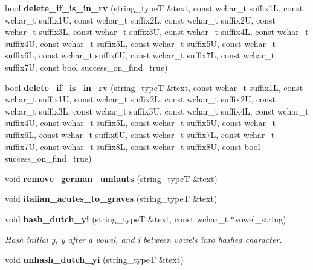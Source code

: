 \begin{DoxyCompactItemize}
\item 
bool {\bfseries delete\+\_\+if\+\_\+is\+\_\+in\+\_\+rv} (string\+\_\+typeT \&text, const wchar\+\_\+t suffix1L, const wchar\+\_\+t suffix1U, const wchar\+\_\+t suffix2L, const wchar\+\_\+t suffix2U, const wchar\+\_\+t suffix3L, const wchar\+\_\+t suffix3U, const wchar\+\_\+t suffix4L, const wchar\+\_\+t suffix4U, const wchar\+\_\+t suffix5L, const wchar\+\_\+t suffix5U, const wchar\+\_\+t suffix6L, const wchar\+\_\+t suffix6U, const wchar\+\_\+t suffix7L, const wchar\+\_\+t suffix7U, const bool success\+\_\+on\+\_\+find=true)\label{classstemming_1_1stem_acc427221d55bf93e113f2811eedca74a}

\item 
bool {\bfseries delete\+\_\+if\+\_\+is\+\_\+in\+\_\+rv} (string\+\_\+typeT \&text, const wchar\+\_\+t suffix1L, const wchar\+\_\+t suffix1U, const wchar\+\_\+t suffix2L, const wchar\+\_\+t suffix2U, const wchar\+\_\+t suffix3L, const wchar\+\_\+t suffix3U, const wchar\+\_\+t suffix4L, const wchar\+\_\+t suffix4U, const wchar\+\_\+t suffix5L, const wchar\+\_\+t suffix5U, const wchar\+\_\+t suffix6L, const wchar\+\_\+t suffix6U, const wchar\+\_\+t suffix7L, const wchar\+\_\+t suffix7U, const wchar\+\_\+t suffix8L, const wchar\+\_\+t suffix8U, const bool success\+\_\+on\+\_\+find=true)\label{classstemming_1_1stem_ab0b50197480905de68f3be29714860d7}

\item 
void {\bfseries remove\+\_\+german\+\_\+umlauts} (string\+\_\+typeT \&text)\label{classstemming_1_1stem_a760765796790f28c1acfa3b1e603781d}

\item 
void {\bfseries italian\+\_\+acutes\+\_\+to\+\_\+graves} (string\+\_\+typeT \&text)\label{classstemming_1_1stem_a85e349feabc837fa38ceb40cbfe8f16e}

\item 
void {\bf hash\+\_\+dutch\+\_\+yi} (string\+\_\+typeT \&text, const wchar\+\_\+t $\ast$vowel\+\_\+string)\label{classstemming_1_1stem_ad7324f61a80140d122da1c087289b737}

\begin{DoxyCompactList}\small\item\em Hash initial y, y after a vowel, and i between vowels into hashed character. \end{DoxyCompactList}\item 
void {\bfseries unhash\+\_\+dutch\+\_\+yi} (string\+\_\+typeT \&text)\label{classstemming_1_1stem_a00a03f9e29573b89ff269e3832aa019b}


\end{DoxyCompactItemize}
